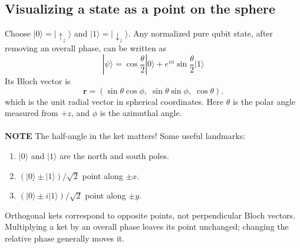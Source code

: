 \documentclass[11pt, answers]{exam}
\begin{document}
    \subsection{Visualizing a state as a point on the sphere}
    Choose \(|0\rangle=|\uparrow_z\rangle\) and \(|1\rangle=|\downarrow_z\rangle\). Any normalized pure qubit state, after removing an overall phase, can be written as
    \[
    |\psi\rangle=\cos\frac{\theta}{2}|0\rangle
    +e^{i\phi}\sin\frac{\theta}{2}|1\rangle
    \]Its Bloch vector is
    \[
    {\mathbf r=(\sin\theta\cos\phi,\;\sin\theta\sin\phi,\;\cos\theta).}
    \]
    which is the unit radial vector in spherical coordinates. Here \(\theta\) is the polar angle measured from \(+z\), and \(\phi\) is the azimuthal angle. \\ \\
    \textbf{NOTE} The half-angle in the ket matters!
    Some useful landmarks:
    \begin{enumerate}[label=(\roman*)]
        \item \(|0\rangle\) and \(|1\rangle\) are the north and south poles.
        \item \((|0\rangle\pm|1\rangle)/\sqrt2\) point along \(\pm x\).
        \item \((|0\rangle\pm i|1\rangle)/\sqrt2\) point along \(\pm y\).
    \end{enumerate}
    Orthogonal kets correspond to opposite points, not perpendicular Bloch vectors. Multiplying a ket by an overall phase leaves its point unchanged; changing the relative phase generally moves it.
\end{document}

